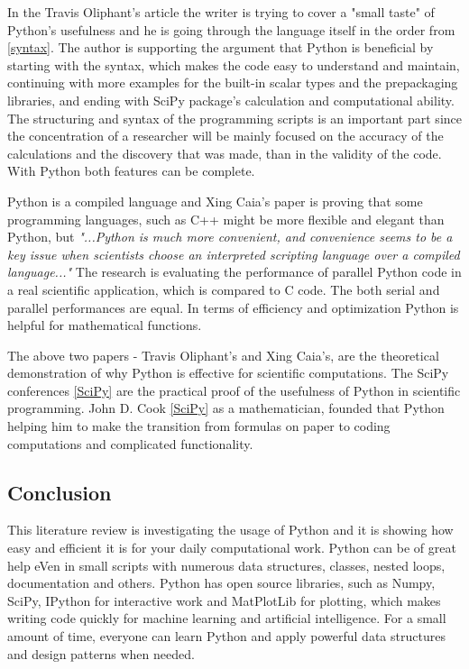  In the Travis Oliphant's article \cite{oliphant2007python} the writer is trying to cover a "small taste" of Python’s usefulness and he is going through the language itself in the order from \ref{syntax}. The author is supporting the argument that Python is beneficial by starting with the syntax, which makes the code easy to understand and maintain, continuing with more examples for the built-in scalar types and the prepackaging libraries, and ending with SciPy package's calculation and computational ability. The structuring and syntax of the programming scripts is an important part since the concentration of a researcher will be mainly focused on the accuracy of the calculations and the discovery that was made, than in the validity of the code. With Python both features can be complete. 
 
Python is a compiled language and Xing Caia's paper \cite{cai2005performance} 
is proving that some programming languages, such as C++ might be more flexible and elegant than Python, but \textit{"...Python is much more convenient, and convenience seems to be a key issue when scientists choose an interpreted scripting language over a compiled language..."} \cite{cai2005performance} The research is evaluating the performance of parallel Python code in a real scientific application, which is compared to C code. The both serial and parallel performances are equal. In terms of efficiency and optimization Python is helpful for mathematical functions.

The above two papers - Travis Oliphant's  and Xing Caia's, are the theoretical demonstration of why Python is effective for scientific computations. The SciPy conferences \ref{SciPy} are the practical proof of the usefulness of Python in scientific programming. John D. Cook \ref{SciPy} as a mathematician, founded that Python helping him to make the transition from formulas on paper to coding computations and complicated functionality. 

\subsection*{Conclusion}
This literature review is investigating the usage of Python and it is showing how easy and efficient it is for your daily computational work. Python can be of great help eVen in small scripts with numerous data structures, classes, nested loops, documentation and others. Python has open source libraries, such as Numpy, SciPy, IPython for interactive work and MatPlotLib for plotting, which makes writing code quickly for machine learning and artificial intelligence. For a small amount of time, everyone can learn Python and apply powerful data structures and design patterns when needed.